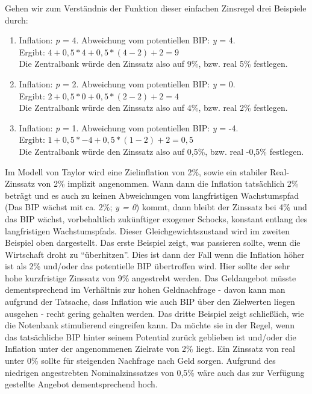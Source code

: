  Gehen wir zum Verständnis der Funktion dieser einfachen Zinsregel drei Beispiele durch:
\begin{enumerate}
	\item Inflation: \textit{p} = 4. Abweichung vom potentiellen BIP: \textit{y} = 4. \\
	Ergibt:	$ 4 + 0,5*4 + 0,5 *(4-2) + 2 = 9$ \\
	Die Zentralbank würde den Zinssatz also auf 9\%, bzw. real 5\% festlegen.
	\item Inflation: \textit{p} = 2. Abweichung vom potentiellen BIP: \textit{y} = 0. \\
	Ergibt:	$ 2 + 0,5*0 + 0,5 *(2-2) + 2 = 4$ \\
	Die Zentralbank würde den Zinssatz also auf 4\%, bzw. real 2\% festlegen.
	\item Inflation: \textit{p} = 1. Abweichung vom potentiellen BIP: \textit{y} = -4. \\
	Ergibt:	$ 1 + 0,5*-4 + 0,5 *(1-2) + 2 = 0,5$ \\
	Die Zentralbank würde den Zinssatz also auf 0,5\%, bzw. real -0,5\% festlegen.
	
\end{enumerate}

Im Modell von Taylor wird eine Zielinflation von 2\%, sowie ein stabiler Real-Zinssatz von 2\% implizit angenommen. 
Wann dann die Inflation tatsächlich 2\% beträgt und es auch zu keinen Abweichungen vom langfristigen Wachstumspfad (Das BIP wächst mit ca. 2\%; \textit{y = 0}) kommt, dann bleibt der Zinssatz bei 4\% und das BIP wächst, vorbehaltlich zukünftiger exogener Schocks, konstant entlang des langfristigen Wachstumspfads. Dieser Gleichgewichtszustand wird im zweiten Beispiel oben dargestellt.
Das erste Beispiel zeigt, was passieren sollte, wenn die Wirtschaft droht zu "`überhitzen"'. Dies ist dann der Fall wenn die Inflation höher ist als 2\% und/oder das potentielle BIP übertroffen wird. Hier sollte der sehr hohe kurzfristige Zinssatz von 9\% angestrebt werden. Das Geldangebot müsste dementsprechend im Verhältnis zur hohen Geldnachfrage - davon kann man aufgrund der Tatsache, dass Inflation wie auch BIP über den Zielwerten liegen ausgehen - recht gering gehalten werden.
Das dritte Beispiel zeigt schließlich, wie die Notenbank stimulierend eingreifen kann. Da möchte sie in der Regel, wenn das tatsächliche BIP hinter seinem Potential zurück geblieben ist und/oder die Inflation unter der angenommenen Zielrate von 2\% liegt. Ein Zinssatz von real unter 0\% sollte für steigenden Nachfrage nach Geld sorgen. Aufgrund des niedrigen angestrebten Nominalzinssatzes von 0,5\% wäre auch das zur Verfügung gestellte Angebot dementsprechend hoch.


